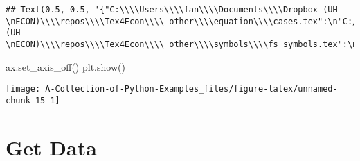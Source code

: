 \documentclass[
]{book}
\newenvironment{Shaded}{\begin{snugshade}}{\end{snugshade}}
\newcommand{\NormalTok}[1]{#1}
\begin{document}
\begin{verbatim}
## Text(0.5, 0.5, '{"C:\\\\Users\\\\fan\\\\Documents\\\\Dropbox (UH-\nECON)\\\\repos\\\\Tex4Econ\\\\_other\\\\equation\\\\cases.tex":\n"C:/Users/fan/Documents/cases.pdf",\n"C:\\\\Users\\\\fan\\\\Documents\\\\Dropbox (UH-\nECON)\\\\repos\\\\Tex4Econ\\\\_other\\\\symbols\\\\fs_symbols.tex":\n"C:/Users/fan/Documents/fs_symbols.pdf"}')
\end{verbatim}

\begin{Shaded}
\begin{Highlighting}[]
\NormalTok{ax.set_axis_off()}
\NormalTok{plt.show()}
\end{Highlighting}
\end{Shaded}

\begin{center}\texttt{[image: A-Collection-of-Python-Examples\_files/figure-latex/unnamed-chunk-15-1]} \end{center}

\hypertarget{get-data}{%
\chapter{Get Data}\label{get-data}}
\end{document}
